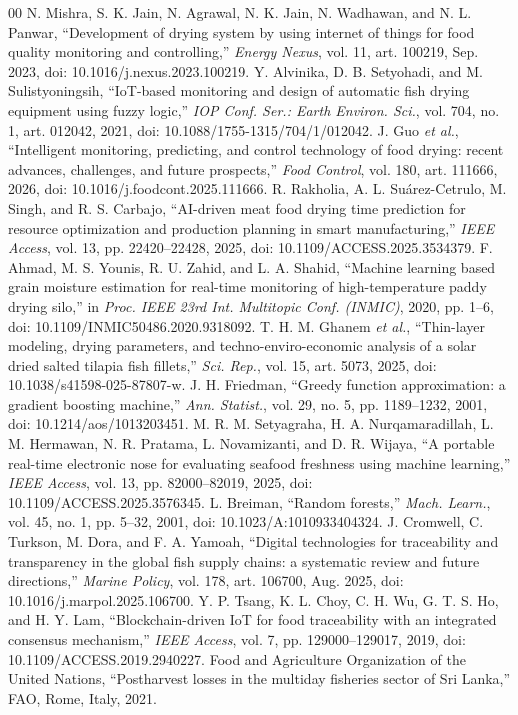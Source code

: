 \documentclass[conference]{IEEEtran}
\begin{document}
\begin{thebibliography}{00}
 N. Mishra, S. K. Jain, N. Agrawal, N. K. Jain, N. Wadhawan,
and N. L. Panwar, ``Development of drying system by using internet of
things for food quality monitoring and controlling,'' \textit{Energy
Nexus}, vol. 11, art. 100219, Sep. 2023, doi: 10.1016/j.nexus.2023.100219.
 Y. Alvinika, D. B. Setyohadi, and M. Sulistyoningsih,
``IoT-based monitoring and design of automatic fish drying equipment using
fuzzy logic,'' \textit{IOP Conf. Ser.: Earth Environ. Sci.}, vol. 704, no.
1, art. 012042, 2021, doi: 10.1088/1755-1315/704/1/012042.
 J. Guo \textit{et al.}, ``Intelligent monitoring, predicting,
and control technology of food drying: recent advances, challenges, and
future prospects,'' \textit{Food Control}, vol. 180, art. 111666, 2026,
doi: 10.1016/j.foodcont.2025.111666.
 R. Rakholia, A. L. Su\'{a}rez-Cetrulo, M. Singh, and R. S.
Carbajo, ``AI-driven meat food drying time prediction for resource
optimization and production planning in smart manufacturing,''
\textit{IEEE Access}, vol. 13, pp. 22420--22428, 2025,
doi: 10.1109/ACCESS.2025.3534379.
 F. Ahmad, M. S. Younis, R. U. Zahid, and L. A. Shahid,
``Machine learning based grain moisture estimation for real-time
monitoring of high-temperature paddy drying silo,'' in \textit{Proc. IEEE
23rd Int. Multitopic Conf. (INMIC)}, 2020, pp. 1--6,
doi: 10.1109/INMIC50486.2020.9318092.
 T. H. M. Ghanem \textit{et al.}, ``Thin-layer modeling,
drying parameters, and techno-enviro-economic analysis of a solar dried
salted tilapia fish fillets,'' \textit{Sci. Rep.}, vol. 15, art. 5073,
2025, doi: 10.1038/s41598-025-87807-w.
 J. H. Friedman, ``Greedy function approximation: a gradient
boosting machine,'' \textit{Ann. Statist.}, vol. 29, no. 5, pp.
1189--1232, 2001, doi: 10.1214/aos/1013203451.
 M. R. M. Setyagraha, H. A. Nurqamaradillah, L. M. Hermawan,
N. R. Pratama, L. Novamizanti, and D. R. Wijaya, ``A portable real-time
electronic nose for evaluating seafood freshness using machine learning,''
\textit{IEEE Access}, vol. 13, pp. 82000--82019, 2025,
doi: 10.1109/ACCESS.2025.3576345.
 L. Breiman, ``Random forests,'' \textit{Mach. Learn.}, vol.
45, no. 1, pp. 5--32, 2001, doi: 10.1023/A:1010933404324.
 J. Cromwell, C. Turkson, M. Dora, and F. A. Yamoah,
``Digital technologies for traceability and transparency in the global
fish supply chains: a systematic review and future directions,''
\textit{Marine Policy}, vol. 178, art. 106700, Aug. 2025,
doi: 10.1016/j.marpol.2025.106700.
 Y. P. Tsang, K. L. Choy, C. H. Wu, G. T. S. Ho, and H. Y.
Lam, ``Blockchain-driven IoT for food traceability with an integrated
consensus mechanism,'' \textit{IEEE Access}, vol. 7, pp. 129000--129017,
2019, doi: 10.1109/ACCESS.2019.2940227.
 Food and Agriculture Organization of the United Nations,
``Postharvest losses in the multiday fisheries sector of Sri Lanka,'' FAO,
Rome, Italy, 2021.
\end{thebibliography}
\end{document}
